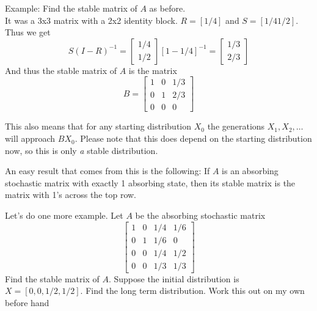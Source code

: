 \documentclass[14,fleqn]{article}
\begin{document}
Example: Find the stable matrix of $A$ as before.\\

It was a 3x3 matrix with a 2x2 identity block. $R=[1/4]$ and $S=[1/4 1/2].$ Thus we get
\[
	S(I-R)^{-1}=\begin{bmatrix}1/4\\1/2\end{bmatrix}\left[1-1/4\right]^{-1}=\begin{bmatrix}1/3\\2/3\end{bmatrix}
\]
And thus the stable matrix of $A$ is the matrix
\[
	B=\begin{bmatrix}1&0&1/3\\0&1&2/3\\0&0&0\end{bmatrix}
\]

This also means that for any starting distribution $X_0$ the generations $X_1,X_2,\dots$ will approach $BX_0.$ Please note that this does depend on the starting distribution now, so this is only \emph{a} stable distribution.

An easy result that comes from this is the following: If $A$ is an absorbing stochastic matrix with exactly 1 absorbing state, then its stable matrix is the matrix with 1's across the top row.



Let's do one more example. Let $A$ be the absorbing stochastic matrix
\[
	\begin{bmatrix}1&0&1/4&1/6\\0&1&1/6&0\\0&0&1/4&1/2\\0&0&1/3&1/3\end{bmatrix}
\]
Find the stable matrix of $A.$ Suppose the initial distribution is $X=[0, 0, 1/2, 1/2].$ Find the long term distribution.
\Large Work this out on my own before hand
\end{document}
